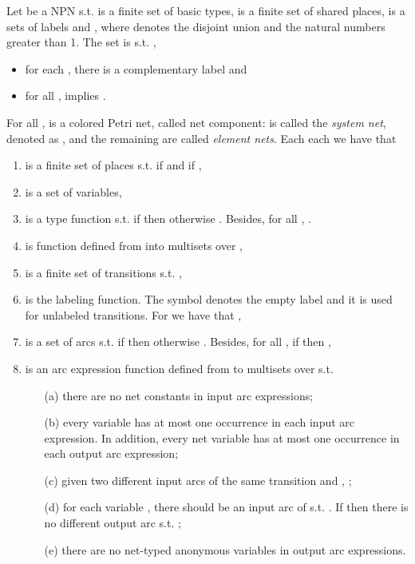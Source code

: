 \documentclass{llncs}
\begin{document}
\begin{definition}
\label{def:npn}
Let  be a NPN s.t.  is a finite set of basic types,  is a finite set of shared places,  is  a sets of labels and , where  denotes the disjoint union and  the natural numbers greater than 1. The set  is s.t. ,


\begin{itemize}
    \item for each , there is a complementary label  and
    \item for all ,  implies .
\end{itemize}

\noindent For all ,  is a colored Petri net, called net component:  is called the \emph{system net}, denoted as , and the remaining are called\emph{ element nets}. Each each  we have that

\begin{enumerate}
    \item  is a finite set of places s.t.  if  and  if ,
    \item  is a set of variables,
    \item  is a type function s.t. if  then   otherwise . Besides, for all , .
    \item  is function defined from  into multisets over ,
    \item  is a finite set of transitions s.t. ,
    \item  is the labeling function. The symbol  denotes the empty label and it is used for unlabeled transitions. For  we have that ,
    \item  is a set of arcs s.t. if  then  otherwise . Besides, for all , if  then ,
    \item  is an arc expression function defined from  to multisets over  s.t.
    \begin{enumerate}
        \item[(a)] there are no net constants in input arc expressions;
        \item[(b)] every variable has at most one occurrence in each input arc expression. In addition, every net variable has at most one occurrence in each output arc expression;
        \item[(c)] given two different input arcs of the same transition  and , ;
        \item[(d)] for each variable , there should be an input arc of  s.t. .
        If  then there is no different output arc  s.t.  ;
        \item[(e)] there are no net-typed anonymous variables in output arc expressions.
    \end{enumerate}
\end{enumerate}

\end{definition}
\end{document}
